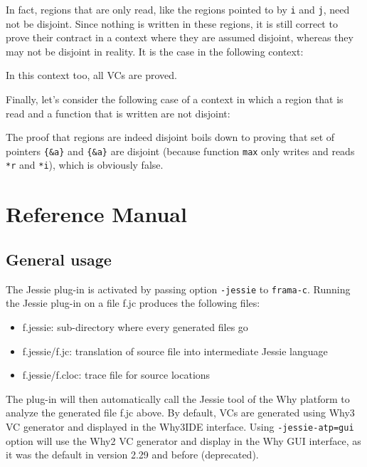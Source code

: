 \documentclass[a4paper,11pt,twoside,openright]{report}
\begin{document}
In fact, regions that are only read, like the regions pointed to by
\verb|i| and \verb|j|, need not be disjoint. Since nothing is written
in these regions, it is still correct to prove their contract in a
context where they are assumed disjoint, whereas they may not be
disjoint in reality. It is the case in the following context:



In this context too, all VCs are proved.

Finally, let's consider the following case of a context in which a
region that is read and a function that is written are not disjoint:



The proof that regions are indeed disjoint boils down to proving that
set of pointers \verb|{&a}| and \verb|{&a}| are disjoint (because
function \verb|max| only writes and reads \verb|*r| and \verb|*i|),
which is obviously false.


\chapter{Reference Manual}

\section{General usage}
\label{sec:general}

The Jessie plug-in is activated by passing option
\verb|-jessie| to \verb|frama-c|. Running the Jessie plug-in
on a file f.jc produces the following files:

\begin{itemize}
\item f.jessie: sub-directory where every generated files go
\item f.jessie/f.jc: translation of source file into intermediate Jessie language
\item f.jessie/f.cloc: trace file for source locations
\end{itemize}

The plug-in will then automatically call the Jessie tool of the Why
platform to analyze the generated file f.jc above. By default, VCs are
generated using Why3 VC generator and displayed in the Why3IDE
interface. Using \verb|-jessie-atp=gui| option will use the Why2 VC
generator and display in the Why GUI interface, as it was the default
in version 2.29 and before (deprecated).
\end{document}
